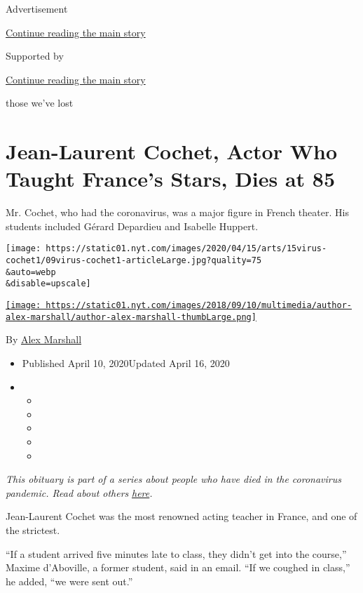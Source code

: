 Advertisement

\protect\hyperlink{after-top}{Continue reading the main story}

Supported by

\protect\hyperlink{after-sponsor}{Continue reading the main story}

those we've lost

\hypertarget{jean-laurent-cochet-actor-who-taught-frances-stars-dies-at-85}{%
\section{Jean-Laurent Cochet, Actor Who Taught France's Stars, Dies at
85}\label{jean-laurent-cochet-actor-who-taught-frances-stars-dies-at-85}}

Mr. Cochet, who had the coronavirus, was a major figure in French
theater. His students included Gérard Depardieu and Isabelle Huppert.

\texttt{[image: https://static01.nyt.com/images/2020/04/15/arts/15virus-cochet1/09virus-cochet1-articleLarge.jpg?quality=75\\\&auto=webp\\\&disable=upscale]}

\href{https://www.nytimes.com/by/alex-marshall}{\texttt{[image: https://static01.nyt.com/images/2018/09/10/multimedia/author-alex-marshall/author-alex-marshall-thumbLarge.png]}}

By \href{https://www.nytimes.com/by/alex-marshall}{Alex Marshall}

\begin{itemize}
\item
  Published April 10, 2020Updated April 16, 2020
\item
  \begin{itemize}
  \item
  \item
  \item
  \item
  \item
  \end{itemize}
\end{itemize}

\emph{This obituary is part of a series about people who have died in
the coronavirus pandemic. Read about others}
\href{https://www.nytimes.com/series/people-who-have-died-of-the-coronavirus}{\emph{here}}\emph{.}

Jean-Laurent Cochet was the most renowned acting teacher in France, and
one of the strictest.

``If a student arrived five minutes late to class, they didn't get into
the course,'' Maxime d'Aboville, a former student, said in an email.
``If we coughed in class,'' he added, ``we were sent out.''

